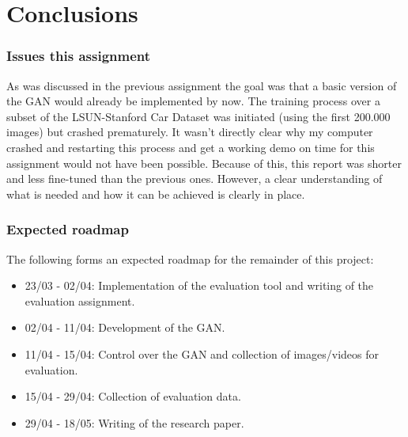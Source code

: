 \part{Conclusions}
\label{part:conclusions}

\section{Issues this assignment}
\label{sec:issues}

As was discussed in the previous assignment the goal was that a basic version of the GAN would already be implemented by now.
The training process over a subset of the LSUN-Stanford Car Dataset was initiated (using the first 200.000 images) but crashed prematurely. 
It wasn't directly clear why my computer crashed and restarting this process and get a working demo on time for this assignment would not have been possible.
Because of this, this report was shorter and less fine-tuned than the previous ones.
However, a clear understanding of what is needed and how it can be achieved is clearly in place.

\section{Expected roadmap}
\label{sec:roadmap}

The following forms an expected roadmap for the remainder of this project:
\begin{itemize}
    \item 23/03 - 02/04: Implementation of the evaluation tool and writing of the evaluation assignment.
    \item 02/04 - 11/04: Development of the GAN.
    \item 11/04 - 15/04: Control over the GAN and collection of images/videos for evaluation.
    \item 15/04 - 29/04: Collection of evaluation data.
    \item 29/04 - 18/05: Writing of the research paper.
\end{itemize}